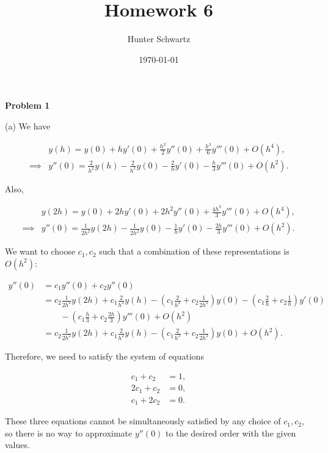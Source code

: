 \documentclass[12pt]{article}
\begin{document}
\title{Homework 6}
\date{\today}
\author{Hunter Schwartz}
\maketitle


\textbf{Problem 1}

(a) We have

\begin{align*}
&y(h) = y(0) + hy'(0) + \frac{h^2}{2}y''(0) + \frac{h^3}{6}y'''(0) + O(h^4), \\
\implies& y''(0) = \frac{2}{h^2} y(h) - \frac{2}{h^2}y(0) - \frac{2}{h}y'(0) - \frac{h}{3}y'''(0) + O(h^2).
\end{align*}

Also,

\begin{align*}
&y(2h) = y(0) + 2hy'(0) + 2h^2 y''(0) + \frac{4h^3}{3}y'''(0) + O(h^4), \\
\implies& y''(0) = \frac{1}{2h^2}y(2h) - \frac{1}{2h^2}y(0) - \frac{1}{h}y'(0) - \frac{2h}{3}y'''(0) + O(h^2).
\end{align*}

We want to choose $c_1,c_2$ such that a combination of these representations is $O(h^2)$:

\begin{align*}
y''(0) &= c_1y''(0) + c_2y''(0) \\
&= c_2\frac{1}{2h^2}y(2h) + c_1 \frac{2}{h^2} y(h) - (c_1\frac{2}{h^2} + c_2\frac{1}{2h^2})y(0) - (c_1\frac{2}{h} + c_2\frac{1}{h})y'(0) \\
&\quad\quad - (c_1\frac{h}{3} + c_2\frac{2h}{3})y'''(0) + O(h^2) \\
&= c_2\frac{1}{2h^2}y(2h) + c_1 \frac{2}{h^2} y(h) - (c_1\frac{2}{h^2} + c_2\frac{1}{2h^2})y(0) + O(h^2).
\end{align*}

Therefore, we need to satisfy the system of equations

\begin{align*}
c_1 + c_2 &= 1, \\
2c_1 + c_2 &= 0, \\
c_1 + 2c_2 &= 0.
\end{align*}

These three equations cannot be simultaneously satisfied by any choice of $c_1,c_2$, so there is no way to approximate $y''(0)$ to the desired order with the given values.

\newpage
\end{document}
